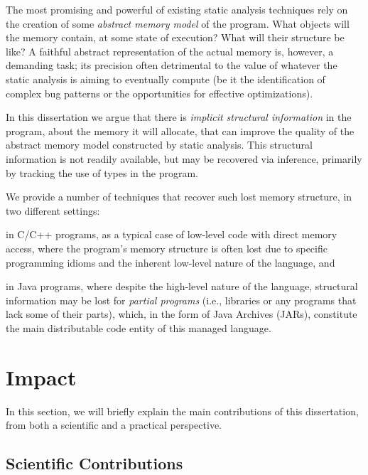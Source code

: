The most promising and powerful of existing static analysis techniques
rely on the creation of some \emph{abstract memory model} of the
program. What objects will the memory contain, at some state of
execution? What will their structure be like?  A faithful abstract
representation of the actual memory is, however, a demanding task; its
precision often detrimental to the value of whatever the static
analysis is aiming to eventually compute (be it the identification of
complex bug patterns or the opportunities for effective
optimizations).

In this dissertation we argue that there is \emph{implicit structural
  information} in the program, about the memory it will allocate, that
can improve the quality of the abstract memory model constructed by
static analysis. This structural information is not readily available,
but may be recovered via inference, primarily by tracking the use of
types in the program.

We provide a number of techniques that recover such
lost memory structure, in two different settings:
\begin{inparaenum}[(1)]
\item in C/C++ programs, as a typical case of low-level code with
  direct memory access, where the program's memory structure is often
  lost due to specific programming idioms and the inherent low-level
  nature of the language, and
\item in Java programs, where despite the high-level nature of the
  language, structural information may be lost for \emph{partial
    programs} (i.e., libraries or any programs that lack some of their
  parts), which, in the form of Java Archives (JARs), constitute the
  main distributable code entity of this managed language.
\end{inparaenum}


\section{Impact}

In this section, we will briefly explain the main contributions of
this dissertation, from both a scientific and a practical perspective.

\subsection{Scientific Contributions}

